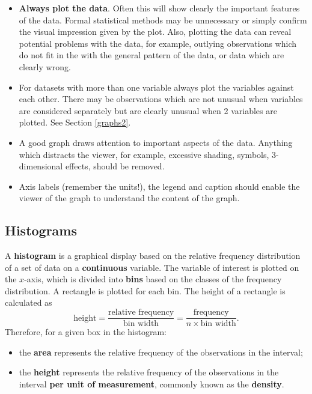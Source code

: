 \documentclass[
  11pt,
  british,
  openany, a4paper]{book}
\providecommand{\tightlist}{%
  \setlength{\itemsep}{0pt}\setlength{\parskip}{0pt}}
\begin{document}
\begin{itemize}
\tightlist
\item
  \textbf{Always plot the data}. Often this will show clearly the important features of the data. Formal statistical methods may be unnecessary or simply confirm the visual impression given by the plot. Also, plotting the data can reveal potential problems with the data, for example, outlying observations which do not fit in the with the general pattern of the data, or data which are clearly wrong.
\item
  For datasets with more than one variable always plot the variables against
  each other. There may be observations which are not unusual when variables are considered separately but are clearly unusual when 2 variables are plotted. See Section \ref{graphs2}.
\item
  A good graph draws attention to important aspects of the data. Anything which distracts the viewer, for example, excessive shading, symbols, 3-dimensional effects, should be removed.\\
\item
  Axis labels (remember the units!), the legend and caption should enable the viewer of the graph to understand the content of the graph.
\end{itemize}

\hypertarget{histogram}{%
\subsection{Histograms}\label{histogram}}

A \textbf{histogram} is a graphical display based on the relative frequency distribution of a set of data on a \textbf{continuous} variable. The variable of interest is plotted on the \(x\)-axis, which is divided into \textbf{bins} based on the classes of the frequency distribution. A rectangle is plotted for each bin. The height of a rectangle is calculated as
\begin{equation}
\mbox{height} = \frac{\mbox{relative frequency}}{\mbox{bin width}} = \frac{\mbox{frequency}}{n \times \mbox{bin width}}.
\label{eq:hist}
\end{equation}
Therefore, for a given box in the histogram:

\begin{itemize}
\tightlist
\item
  the \textbf{area} represents the relative frequency of the observations in
  the interval;
\item
  the \textbf{height} represents the relative frequency of the observations in
  the interval \textbf{per unit of measurement}, commonly known as the \textbf{density}.
\end{itemize}
\end{document}
